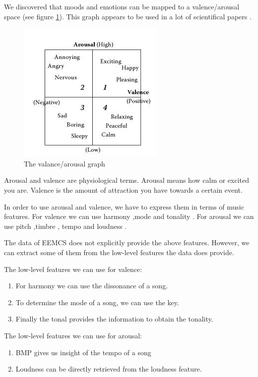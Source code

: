 \documentclass[10pt,a4paper]{article}
\begin{document}
We discovered that moods and emotions can be mapped to a valence/arousal space (see figure \ref{fig:avgraph}).
This graph appears to be used in a lot of scientifical papers \cite{Kosina} \cite{McVicar}.

\begin{figure}[h]
\includegraphics[scale=0.75]{avgraph.jpg}
\caption{The valance/arousal graph \cite{Book}}
\label{fig:avgraph}

\end{figure}

Arousal and valence are physiological terms.
Arousal means how calm or excited you are.
Valence is the amount of attraction you have towards a certain event.

In order to use arousal and valence, we have to express them in terms of music features.
For valence we can use harmony \cite{PresentationMER},mode  \cite{PresentationMER} and tonality  \cite{PresentationMER}.
For arousal we can use pitch \cite{PresentationMER} ,timbre \cite{PresentationMER}, tempo \cite{PresentationMER} and loudness \cite{PaperME}.

\newpage

The data of EEMCS does not explicitly provide the above features. However, we can extract some of them from the low-level features the data does provide.

The low-level features we can use for valence:
\begin{enumerate}
\item For harmony we can use the dissonance of a song.
\item To determine the mode of a song, we can use the key.
\item Finally the tonal provides the information to obtain the tonality.
\end{enumerate}
The low-level features we can use for arousal:
\begin{enumerate}
\item BMP gives us insight of the tempo of a song
\item Loudness can be directly retrieved from the loudness feature.
\end{enumerate}
\end{document}
